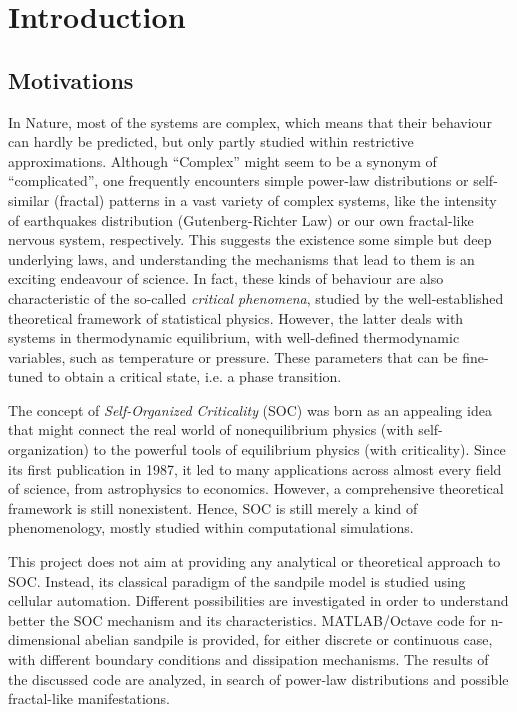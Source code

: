 \chapter{Introduction}
\thispagestyle{fancy}

\section{Motivations}
In Nature, most of the systems are complex, which means that their behaviour can hardly be predicted, but only partly studied within restrictive approximations. Although ``Complex'' might seem to be a synonym of ``complicated'', one frequently encounters simple power-law distributions or self-similar (fractal) patterns in a vast variety of complex systems, like the intensity of earthquakes distribution (Gutenberg-Richter Law) or our own fractal-like nervous system, respectively. This suggests the existence some simple but deep underlying laws, and understanding the mechanisms that lead to them is an exciting endeavour of science. In fact, these kinds of behaviour are also characteristic of the so-called \emph{critical phenomena}, studied by the well-established theoretical framework of statistical physics. However, the latter deals with systems in thermodynamic equilibrium, with well-defined thermodynamic variables, such as temperature or pressure. These parameters that can be fine-tuned to obtain a critical state, i.e. a phase transition.

The concept of \emph{Self-Organized Criticality} (SOC) was born as an appealing idea that might connect the real world of nonequilibrium physics (with self-organization) to the powerful tools of equilibrium physics (with criticality). Since its first publication in 1987, it led to many applications across almost every field of science, from astrophysics to economics. However, a comprehensive theoretical framework is still nonexistent. Hence, SOC is still merely a kind of phenomenology, mostly studied within computational simulations.
 
This project does not aim at providing any analytical or theoretical approach to SOC. Instead, its classical paradigm of the sandpile model is studied using cellular automation. Different possibilities are investigated in order to understand better the SOC mechanism and its characteristics. MATLAB/Octave code for n-dimensional abelian sandpile is provided, for either discrete or continuous case, with different boundary conditions and dissipation mechanisms. The results of the discussed code are analyzed, in search of power-law distributions and possible fractal-like manifestations.

